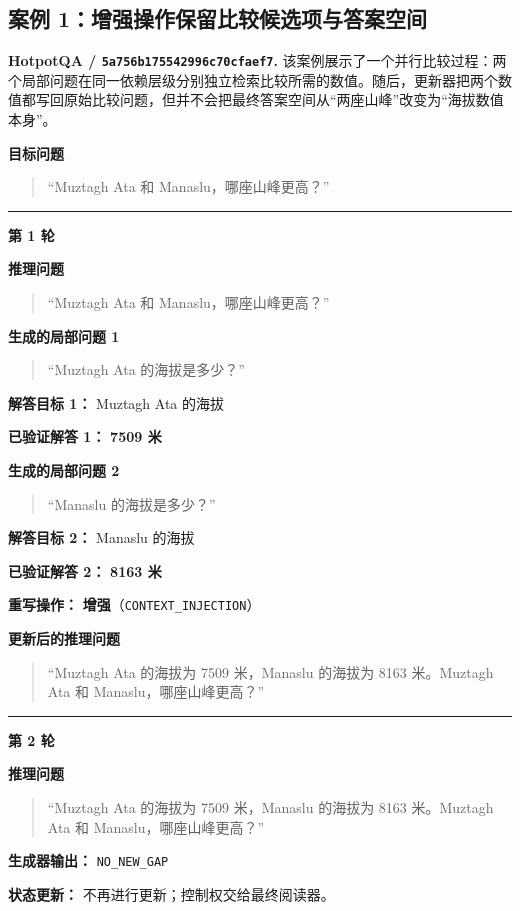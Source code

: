 \documentclass[11pt]{article}
\begin{document}
	\newcommand{\tracequestion}[2]{%
		\noindent\textbf{#1}\par
		\begin{quote}\small #2\end{quote}}
	\newcommand{\traceitem}[2]{%
		\noindent\textbf{#1} #2\par}
	\newcommand{\traceround}[1]{%
		\par\smallskip
		\noindent\rule{\columnwidth}{0.35pt}\par
		\noindent\textbf{第 #1 轮}\par\smallskip}
	\newcommand{\traceend}{%
		\par\smallskip\noindent\rule{\columnwidth}{0.55pt}\par\smallskip}

	\subsection{案例 1：增强操作保留比较候选项与答案空间}
	\label{case:hotpot-augmentation}

	\noindent\textbf{HotpotQA / \texttt{5a756b175542996c70cfaef7}.}
	该案例展示了一个并行比较过程：两个局部问题在同一依赖层级分别独立检索比较所需的数值。随后，更新器把两个数值都写回原始比较问题，但并不会把最终答案空间从“两座山峰”改变为“海拔数值本身”。

	\tracequestion{目标问题}{``Muztagh Ata 和 Manaslu，哪座山峰更高？''}

	\traceround{1}
	\tracequestion{推理问题}{``Muztagh Ata 和 Manaslu，哪座山峰更高？''}
	\tracequestion{生成的局部问题 1}{``Muztagh Ata 的海拔是多少？''}
	\traceitem{解答目标 1：}{Muztagh Ata 的海拔}
	\traceitem{已验证解答 1：}{\textbf{7509 米}}
	\tracequestion{生成的局部问题 2}{``Manaslu 的海拔是多少？''}
	\traceitem{解答目标 2：}{Manaslu 的海拔}
	\traceitem{已验证解答 2：}{\textbf{8163 米}}
	\traceitem{重写操作：}{\textbf{增强}（\texttt{CONTEXT\_INJECTION}）}
	\tracequestion{更新后的推理问题}{``Muztagh Ata 的海拔为 7509 米，Manaslu 的海拔为 8163 米。Muztagh Ata 和 Manaslu，哪座山峰更高？''}

	\traceround{2}
	\tracequestion{推理问题}{``Muztagh Ata 的海拔为 7509 米，Manaslu 的海拔为 8163 米。Muztagh Ata 和 Manaslu，哪座山峰更高？''}
	\traceitem{生成器输出：}{\texttt{NO\_NEW\_GAP}}
	\traceitem{状态更新：}{不再进行更新；控制权交给最终阅读器。}
\end{document}
